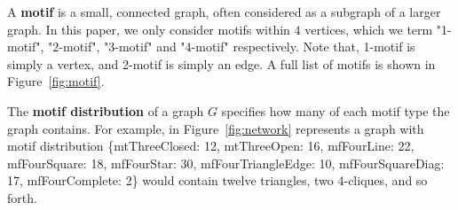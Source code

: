 A \textbf{motif} is a small, connected graph, often considered as a
subgraph of a larger graph. In this paper, we only
consider motifs within $4$ vertices, which we term "1-motif", "2-motif", "3-motif" and
"4-motif" respectively. Note that, 1-motif is simply a vertex, and 2-motif is simply an edge. A full list of motifs is shown in
Figure~\ref{fig:motif}.

The \textbf{motif distribution} of a graph $G$ specifies how many of each
motif type the graph contains.  For example, in Figure~\ref{fig:network} represents a graph with motif
distribution \{mtThreeClosed: 12, mtThreeOpen: 16, mfFourLine: 22,
mfFourSquare: 18, mfFourStar: 30, mfFourTriangleEdge: 10, mfFourSquareDiag:
17, mfFourComplete: 2\} would contain twelve triangles, two 4-cliques, and
so forth.
